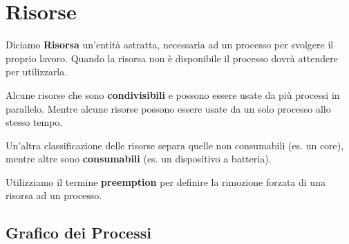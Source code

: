 \section{Risorse}
Diciamo \textbf{Risorsa} un'entità astratta, necessaria ad un processo per svolgere il proprio lavoro. Quando la risorsa non è disponibile il processo dovrà attendere per utilizzarla.

\spacer
Alcune risorse che sono \textbf{condivisibili} e possono essere usate da più processi in parallelo. Mentre alcune risorse possono essere usate da un solo processo allo stesso tempo.

\spacer
Un'altra classificazione delle risorse separa quelle non consumabili (es. un core), mentre altre sono \textbf{consumabili} (es. un dispositivo a batteria).

\spacer
Utilizziamo il termine \textbf{preemption} per definire la rimozione forzata di una risorsa ad un processo.

\subsection{Grafico dei Processi}

